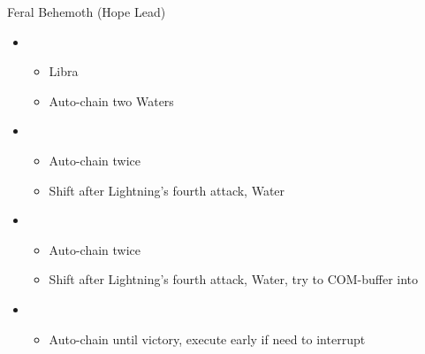 \begin{battle}{Feral Behemoth (Hope Lead)}
\begin{itemize}
    \item \first
    \begin{itemize}
        \item Libra
        \item Auto-chain two Waters
    \end{itemize}
    \item \fourth
    \begin{itemize}
        \item Auto-chain twice
        \item Shift after Lightning's fourth attack, Water
    \end{itemize}
    \item \fifth
    \begin{itemize}
        \item Auto-chain twice
        \item Shift after Lightning's fourth attack, Water, try to COM-buffer into
    \end{itemize}
    \item \first
    \begin{itemize}
        \item Auto-chain until victory, execute early if need to interrupt
    \end{itemize}
\end{itemize}
\end{battle}

